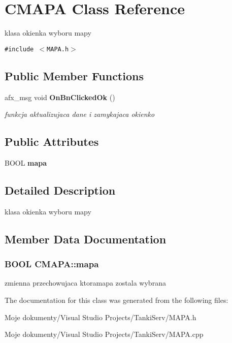\section{CMAPA Class Reference}
\label{class_c_m_a_p_a}
klasa okienka wyboru mapy  


{\tt \#include $<$MAPA.h$>$}

\subsection*{Public Member Functions}
\begin{CompactItemize}
\item 
afx\_\-msg void {\bf OnBnClickedOk} ()\label{class_c_m_a_p_a_bd567c4fd8a8844c0cca1264a4508090}

\begin{CompactList}\small\item\em funkcja aktualizujaca dane i zamykajaca okienko \item\end{CompactList}\end{CompactItemize}
\subsection*{Public Attributes}
\begin{CompactItemize}
\item 
BOOL {\bf mapa}
\end{CompactItemize}


\subsection{Detailed Description}
klasa okienka wyboru mapy 



\subsection{Member Data Documentation}
\subsubsection{\setlength{\rightskip}{0pt plus 5cm}BOOL {\bf CMAPA::mapa}}\label{class_c_m_a_p_a_aa7e962c0f140ed43c092b693c399783}


zmienna przechowujaca ktoramapa zostala wybrana 

The documentation for this class was generated from the following files:\begin{CompactItemize}
\item 
Moje dokumenty/Visual Studio Projects/TankiServ/MAPA.h\item 
Moje dokumenty/Visual Studio Projects/TankiServ/MAPA.cpp\end{CompactItemize}
